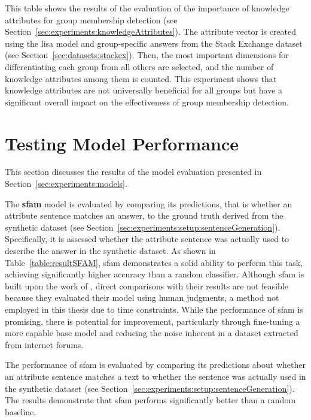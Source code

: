 \begin{table}[ht]
  \caption[]{This table shows the results of the evaluation of the importance of knowledge attributes for group membership detection (see Section~\ref{sec:experiments:knowledgeAttributes}). The attribute vector is created using the \ac{lisa} model and group-specific answers from the Stack Exchange dataset (see Section~\ref{sec:datasets:stackex}). Then, the most important dimensions for differentiating each group from all others are selected, and the number of knowledge attributes among them is counted. This experiment shows that knowledge attributes are not universally beneficial for all groups but have a significant overall impact on the effectiveness of group membership detection.}%
  \label{table:knowledgeImportance}
  \resultKnowledgeImportance{}
\end{table}

\section{Testing Model Performance}%
\label{sec:evaluation:models}

This section discusses the results of the model evaluation presented in Section~\ref{sec:experiments:models}.

The \textbf{\acs{sfam}} model is evaluated by comparing its predictions, that is whether an attribute sentence matches an answer, to the ground truth derived from the synthetic dataset (see Section~\ref{sec:experiments:setup:sentenceGeneration}). Specifically, it is assessed whether the attribute sentence was actually used to describe the answer in the synthetic dataset. As shown in Table~\ref{table:resultSFAM}, \ac{sfam} demonstrates a solid ability to perform this task, achieving significantly higher accuracy than a random classifier. Although \ac{sfam} is built upon the work of \citet{patelLearningInterpretableStyle2023}, direct comparisons with their results are not feasible because they evaluated their model using human judgments, a method not employed in this thesis due to time constraints. While the performance of \ac{sfam} is promising, there is potential for improvement, particularly through fine-tuning a more capable base model and reducing the noise inherent in a dataset extracted from internet forums.

\begin{table}[ht]
  \caption[]{The performance of \ac{sfam} is evaluated by comparing its predictions about whether an attribute sentence matches a text to whether the sentence was actually used in the synthetic dataset (see Section~\ref{sec:experiments:setup:sentenceGeneration}). The results demonstrate that \ac{sfam} performs significantly better than a random baseline.}%
  \label{table:resultSFAM}
  \centering
  \resultSfam{}
\end{table}

